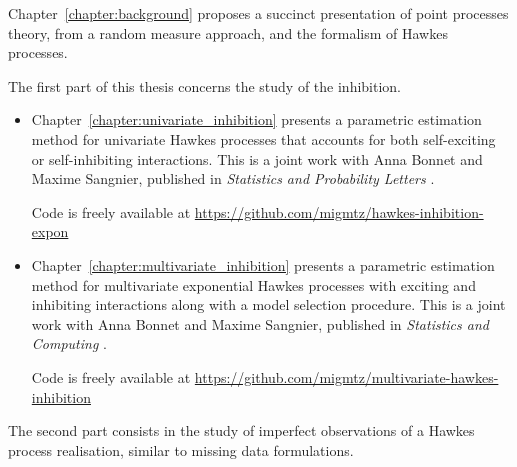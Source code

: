 
    Chapter~\ref{chapter:background} proposes a succinct presentation of point processes theory, from a random measure approach, and the formalism of Hawkes processes.

    The first part of this thesis concerns the study of the inhibition.

    \begin{itemize}
      \item Chapter~\ref{chapter:univariate_inhibition} presents a parametric estimation method for univariate Hawkes processes that accounts for both self-exciting or self-inhibiting interactions. 
      This is a joint work with Anna Bonnet and Maxime Sangnier, published in \textit{Statistics and Probability Letters} \parencite{bonnet2021}.
      
      Code is freely available at \url{https://github.com/migmtz/hawkes-inhibition-expon}

      \item Chapter~\ref{chapter:multivariate_inhibition} presents a parametric estimation method for multivariate exponential Hawkes processes with exciting and inhibiting interactions along with a model selection procedure. 
      This is a joint work with Anna Bonnet and Maxime Sangnier, published in \textit{Statistics and Computing} \parencite{Bonnet2023}.
      
      Code is freely available at \url{https://github.com/migmtz/multivariate-hawkes-inhibition}

    \end{itemize}

    The second part consists in the study of imperfect observations of a Hawkes process realisation, similar to missing data formulations.

